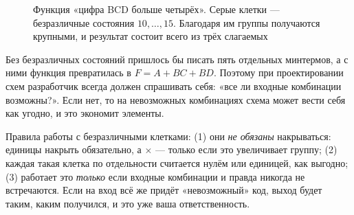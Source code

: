 \begin{figure}[H]
\centering
{}
\caption{Функция «цифра BCD больше четырёх». Серые клетки --- безразличные состояния $10,\ldots,15$. Благодаря им группы получаются крупными, и результат состоит всего из трёх слагаемых}
\label{fig:karnaugh_dc}
\end{figure}

Без безразличных состояний пришлось бы писать пять отдельных
минтермов, а с ними функция превратилась в $F = A + BC + BD$. Поэтому при
проектировании схем разработчик всегда должен спрашивать себя: «все ли
входные комбинации возможны?». Если нет, то на невозможных комбинациях
схема может вести себя как угодно, и это экономит элементы.

Правила работы с безразличными клетками: (1) они \emph{не обязаны}
накрываться: единицы накрыть обязательно, а $\times$ --- только если это
увеличивает группу; (2) каждая такая клетка по отдельности считается нулём
или единицей, как выгодно; (3) работает это \emph{только} если входные
комбинации и правда никогда не встречаются. Если на вход всё же придёт
«невозможный» код, выход будет таким, каким получился, и это уже ваша
ответственность.

